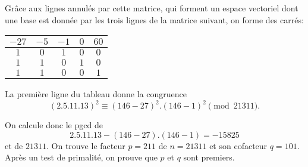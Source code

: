 \documentclass[french, 12pt, titlepage]{article}
\begin{document}
Grâce aux lignes annulés par cette matrice, qui forment un espace vectoriel dont une base est donnée par les trois lignes de la matrice suivant, on forme des carrés:

\begin{center}
\begin{tabular}{ccccc}
 $-27$ & $-5$ & $-1$ & $0$ & $60$\\
\hline
$1$ & $0$ & $1$ & $0$ & $0$\\
$1$ & $1$ & $0$ & $1$ & $0$\\
$1$ & $1$ & $0$ & $0$ & $1$\\
\end{tabular}
\end{center}

La première ligne du tableau donne la congruence \[ (2.5.11.13)^2 \equiv (146 - 27)^2.(146 - 1)^2 \pmod{21311} .\]

On calcule donc le pgcd de \[ 2.5.11.13 - (146 - 27).(146 - 1) = -15825 \] et de $21311.$ On trouve le facteur $p = 211$ de $n = 21311$ et son cofacteur $q = 101.$
Après un test de primalité, on prouve que $p$ et $q$ sont premiers.  
\end{document}
